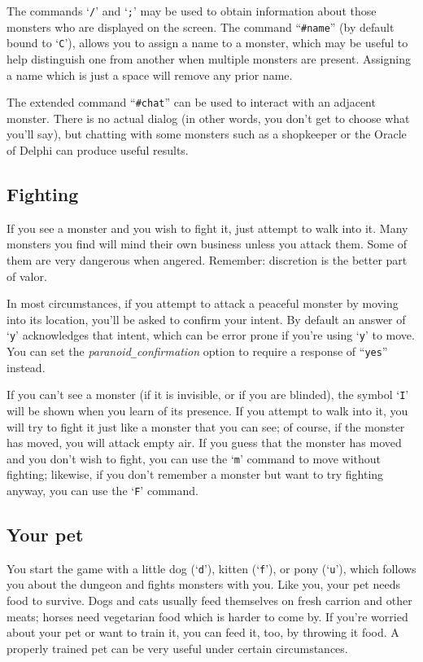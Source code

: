 The commands `{\tt /}' and `{\tt ;}' may be used to obtain information
about those
monsters who are displayed on the screen.  The command ``{\tt \#name}''
(by default bound to `{\tt C}'), allows you
to assign a name to a monster, which may be useful to help distinguish
one from another when multiple monsters are present.  Assigning a name
which is just a space will remove any prior name.

The extended command ``{\tt \#chat}'' can be used to interact with an adjacent
monster.  There is no actual dialog (in other words, you don't get to
choose what you'll say), but chatting with some monsters such as a
shopkeeper or the Oracle of Delphi can produce useful results.

\subsection*{Fighting}

If you see a monster and you wish to fight it, just attempt to walk
into it.  Many monsters you find will mind their own business unless
you attack them.  Some of them are very dangerous when angered.
Remember:  discretion is the better part of valor.

In most circumstances, if you attempt to attack a peaceful monster by
moving into its location, you'll be asked to confirm your intent.  By
default an answer of `{\tt y}' acknowledges that intent,
which can be error prone if you're using `{\tt y}' to move.  You can set the
{\it paranoid\verb+_+confirmation\/}
option to require a response of ``{\tt yes}'' instead.

If you can't see a monster (if it is invisible, or if you are blinded),
the symbol `{\tt I}' will be shown when you learn of its presence.
If you attempt to walk into it, you will try to fight it just like
a monster that you can see; of course,
if the monster has moved, you will attack empty air.  If you guess
that the monster has moved and you don't wish to fight, you can use the
`{\tt m}' command to move without fighting; likewise, if you don't remember
a monster but want to try fighting anyway, you can use the `{\tt F}' command.

\subsection*{Your pet}

You start the game with a little dog (`{\tt d}'), kitten (`{\tt f}'),
or pony (`{\tt u}'), which follows
you about the dungeon and fights monsters with you.
Like you, your pet needs food to survive.
Dogs and cats usually feed themselves on fresh carrion and other meats;
horses need vegetarian food which is harder to come by.
If you're worried about your pet or want to train it, you
can feed it, too, by throwing it food.
A properly trained pet can be very useful under certain circumstances.

